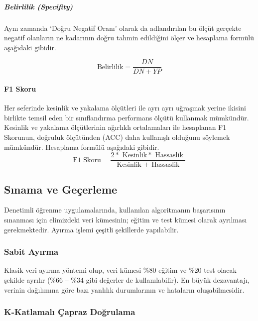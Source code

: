 \documentclass[12pt,twoside]{deuthesis}
\begin{document}
\hypertarget{belirlilik-specifity}{%
\subparagraph{Belirlilik (Specifity)}\label{belirlilik-specifity}}

Aynı zamanda `Doğru Negatif Oranı' olarak da adlandırılan bu ölçüt gerçekte negatif olanların ne kadarının doğru tahmin edildiğini ölçer ve hesaplama formülü aşağıdaki gibidir.

\[
\text {Belirlilik}=\frac{D N}{D N+Y P}
\]

\hypertarget{f1-skoru}{%
\paragraph{F1 Skoru}\label{f1-skoru}}

Her seferinde kesinlik ve yakalama ölçütleri ile ayrı ayrı uğraşmak yerine ikisini birlikte temsil eden bir sınıflandırma performans ölçütü kullanmak mümkündür. Kesinlik ve yakalama ölçütlerinin ağırlıklı ortalamaları ile hesaplanan F1 Skorunun, doğruluk ölçütünden (ACC) daha kullanışlı olduğunu söylemek mümkündür. Hesaplama formülü aşağıdaki gibidir.
\[
\text {F1 Skoru} =\frac{2 * \text { Kesinlik} * \text { Hassaslik }}{\text { Kesinlik }+\text { Hassaslik }}
\]

\hypertarget{sux131nama-ve-geuxe7erleme}{%
\subsection{Sınama ve Geçerleme}\label{sux131nama-ve-geuxe7erleme}}

Denetimli öğrenme uygulamalarında, kullanılan algoritmanın başarısının sınanması için elimizdeki veri kümesinin; eğitim ve test kümesi olarak ayrılması gerekmektedir. Ayırma işlemi çeşitli şekillerde yapılabilir.

\hypertarget{sabit-ayux131rma}{%
\subsubsection{Sabit Ayırma}\label{sabit-ayux131rma}}

Klasik veri ayırma yöntemi olup, veri kümesi \%80 eğitim ve \%20 test olacak şekilde ayrılır (\%66 -- \%34 gibi değerler de kullanılabilir). En büyük dezavantajı, verinin dağılımına göre bazı yanlılık durumlarının ve hataların oluşabilmesidir.

\hypertarget{k-katlamalux131-uxe7apraz-doux11frulama}{%
\subsubsection{K-Katlamalı Çapraz Doğrulama}\label{k-katlamalux131-uxe7apraz-doux11frulama}}
\end{document}
